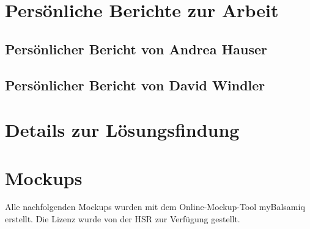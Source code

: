 \documentclass[12pt, a4paper]{report}
\begin{document}
	
	\chapter{Persönliche Berichte zur Arbeit}
	\section{Persönlicher Bericht von Andrea Hauser}
	
	\newpage
	\section{Persönlicher Bericht von David Windler}
	
	
	
	\chapter{Details zur Lösungsfindung}
	
	
	
	
	
	
	
	
	
	
	
	
	
	\chapter{Mockups}
	\label{chap:mockups}
	Alle nachfolgenden Mockups wurden mit dem Online-Mockup-Tool myBalsamiq erstellt. Die Lizenz wurde von der HSR zur Verfügung gestellt.
	
\end{document}
